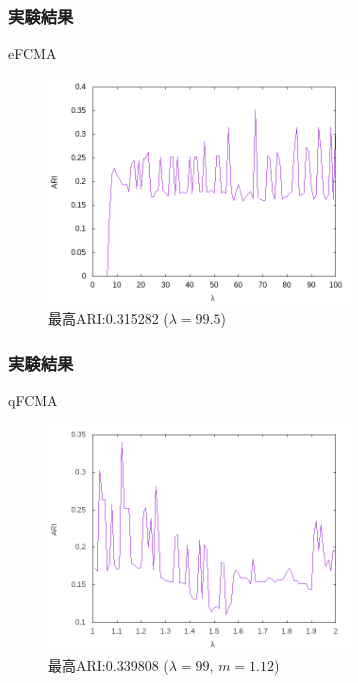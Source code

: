 \documentclass[13pt,dvipdfmx]{beamer}
\begin{document}
\begin{frame}\frametitle{実験結果}
  \begin{block}{eFCMA}
    \begin{figure}[htbp]
      \begin{center}
        \includegraphics[height=60mm]{efcma_ARI.png}
      \end{center}
      \captionsetup{labelformat=empty,labelsep=none}
      \caption{最高ARI:0.315282 ($\lambda=99.5$)}
    \end{figure}
  \end{block}
\end{frame}


\begin{frame}\frametitle{実験結果}
  \begin{block}{qFCMA}
    \begin{figure}[htbp]
      \begin{center}
        \includegraphics[height=60mm]{qfcma_ARI.png}
      \end{center}
      \captionsetup{labelformat=empty,labelsep=none}
      \caption{最高ARI:0.339808 ($\lambda=99$, $m=1.12$)}
    \end{figure}
  \end{block}
\end{frame}
\end{document}
